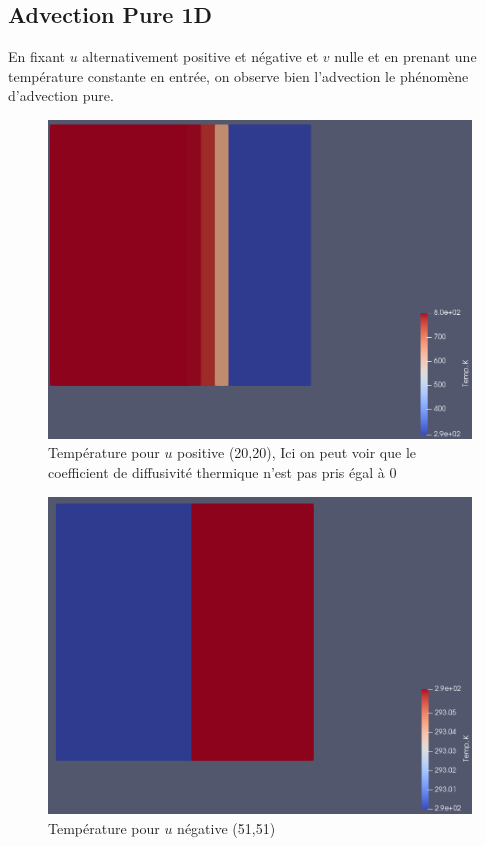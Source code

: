 \documentclass[a4paper,oneside]{article}
\begin{document}
\subsection{Advection Pure 1D}

En fixant $u$ alternativement positive et négative et $v$ nulle et en prenant une température constante en entrée, on observe bien l'advection le phénomène d'advection pure.

\begin{figure}[h!]
\centering
\includegraphics[scale=0.3]{Advection_Pure_1D/AdvGauche.png}
\caption{Température pour $u$ positive  (20,20), Ici on peut voir que le coefficient de diffusivité thermique n'est pas pris égal à 0}

\end{figure}

\begin{figure}[h!]
\centering
\includegraphics[scale=0.3]{Advection_Pure_1D/AdvDroite.png}
\caption{Température pour $u$ négative (51,51)}
\end{figure}
\end{document}
